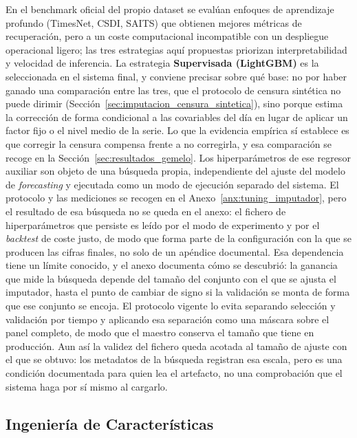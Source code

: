 En el benchmark oficial del propio dataset \cite{freshretailnet2025} se evalúan enfoques de aprendizaje profundo (TimesNet, CSDI, SAITS) que obtienen mejores métricas de recuperación, pero a un coste computacional incompatible con un despliegue operacional ligero; las tres estrategias aquí propuestas priorizan interpretabilidad y velocidad de inferencia. La estrategia \textbf{Supervisada (LightGBM)} es la seleccionada en el sistema final, y conviene precisar sobre qué base: no por haber ganado una comparación entre las tres, que el protocolo de censura sintética no puede dirimir (Sección~\ref{sec:imputacion_censura_sintetica}), sino porque estima la corrección de forma condicional a las covariables del día en lugar de aplicar un factor fijo o el nivel medio de la serie. Lo que la evidencia empírica sí establece es que corregir la censura compensa frente a no corregirla, y esa comparación se recoge en la Sección~\ref{sec:resultados_gemelo}. Los hiperparámetros de ese regresor auxiliar son objeto de una búsqueda propia, independiente del ajuste del modelo de \textit{forecasting} y ejecutada como un modo de ejecución separado del sistema. El protocolo y las mediciones se recogen en el Anexo~\ref{anx:tuning_imputador}, pero el resultado de esa búsqueda no se queda en el anexo: el fichero de hiperparámetros que persiste es leído por el modo de experimento y por el \textit{backtest} de coste justo, de modo que forma parte de la configuración con la que se producen las cifras finales, no solo de un apéndice documental. Esa dependencia tiene un límite conocido, y el anexo documenta cómo se descubrió: la ganancia que mide la búsqueda depende del tamaño del conjunto con el que se ajusta el imputador, hasta el punto de cambiar de signo si la validación se monta de forma que ese conjunto se encoja. El protocolo vigente lo evita separando selección y validación por tiempo y aplicando esa separación como una máscara sobre el panel completo, de modo que el maestro conserva el tamaño que tiene en producción. Aun así la validez del fichero queda acotada al tamaño de ajuste con el que se obtuvo: los metadatos de la búsqueda registran esa escala, pero es una condición documentada para quien lea el artefacto, no una comprobación que el sistema haga por sí mismo al cargarlo.

\subsection{Ingeniería de Características}
\label{sec:feature_engineering}

